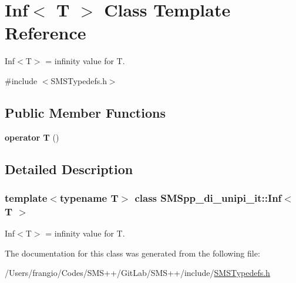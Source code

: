 \hypertarget{class_s_m_spp__di__unipi__it_1_1_inf}{}\section{Inf$<$ T $>$ Class Template Reference}
\label{class_s_m_spp__di__unipi__it_1_1_inf}


Inf$<$\+T$>$ = infinity value for T.  




{\ttfamily \#include $<$S\+M\+S\+Typedefs.\+h$>$}

\subsection*{Public Member Functions}
\begin{DoxyCompactItemize}
\item 
\mbox{\label{class_s_m_spp__di__unipi__it_1_1_inf_a4b15b6419d4ff99730ee9df795b90f61}} 
{\bfseries operator T} ()
\end{DoxyCompactItemize}


\subsection{Detailed Description}
\subsubsection*{template$<$typename T$>$\newline
class S\+M\+Spp\+\_\+di\+\_\+unipi\+\_\+it\+::\+Inf$<$ T $>$}

Inf$<$\+T$>$ = infinity value for T. 

The documentation for this class was generated from the following file\+:\begin{DoxyCompactItemize}
\item 
/\+Users/frangio/\+Codes/\+S\+M\+S++/\+Git\+Lab/\+S\+M\+S++/include/\mbox{\hyperlink{_s_m_s_typedefs_8h}{S\+M\+S\+Typedefs.\+h}}\end{DoxyCompactItemize}
